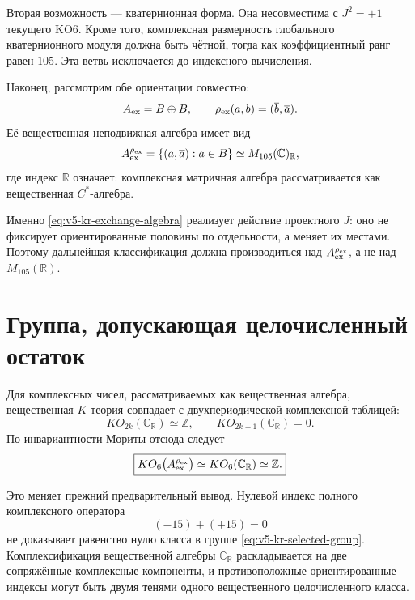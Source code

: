 Вторая возможность --- кватернионная форма. Она несовместима с
$J^2=+1$ текущего KO6. Кроме того, комплексная размерность глобального
кватернионного модуля должна быть чётной, тогда как коэффициентный ранг
равен $105$. Эта ветвь исключается до индексного вычисления.

Наконец, рассмотрим обе ориентации совместно:
\begin{equation}
 A_{\rm ex}=B\oplus B,
 \qquad
 \rho_{\rm ex}(a,b)=(\overline b,\overline a).
 \label{eq:v5-kr-exchange-algebra}
\end{equation}
Её вещественная неподвижная алгебра имеет вид
\begin{equation}
 A_{\rm ex}^{\rho_{\rm ex}}
 =\{(a,\overline a):a\in B\}
 \simeq M_{105}(\mathbb C)_{\mathbb R},
 \label{eq:v5-kr-fixed-complex-real}
\end{equation}
где индекс $\mathbb R$ означает: комплексная матричная алгебра
рассматривается как вещественная $C^*$-алгебра.

Именно \eqref{eq:v5-kr-exchange-algebra} реализует действие проектного
$J$: оно не фиксирует ориентированные половины по отдельности, а меняет
их местами. Поэтому дальнейшая классификация должна производиться над
$A_{\rm ex}^{\rho_{\rm ex}}$, а не над $M_{105}(\mathbb R)$.

\section{Группа, допускающая целочисленный остаток}

Для комплексных чисел, рассматриваемых как вещественная алгебра,
вещественная $K$-теория совпадает с двухпериодической комплексной таблицей:
\begin{equation}
 KO_{2k}(\mathbb C_{\mathbb R})\simeq\mathbb Z,
 \qquad
 KO_{2k+1}(\mathbb C_{\mathbb R})=0.
\end{equation}
По инвариантности Мориты отсюда следует
\begin{equation}
 \boxed{
 KO_6\bigl(A_{\rm ex}^{\rho_{\rm ex}}\bigr)
 \simeq KO_6(\mathbb C_{\mathbb R})
 \simeq\mathbb Z.}
 \label{eq:v5-kr-selected-group}
\end{equation}

Это меняет прежний предварительный вывод. Нулевой индекс полного
комплексного оператора
\begin{equation}
 (-15)+(+15)=0
\end{equation}
не доказывает равенство нулю класса в группе
\eqref{eq:v5-kr-selected-group}. Комплексификация вещественной алгебры
$\mathbb C_{\mathbb R}$ раскладывается на две сопряжённые комплексные
компоненты, и противоположные ориентированные индексы могут быть двумя
тенями одного вещественного целочисленного класса.


